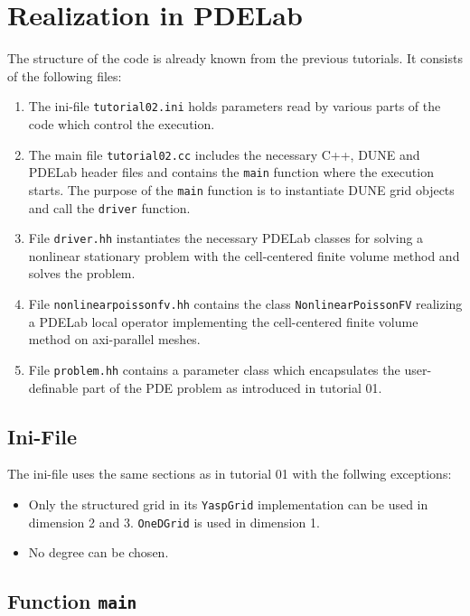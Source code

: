 \documentclass[a4paper,12pt]{article}
\begin{document}
\section{Realization in PDELab}

The structure of the code is already known from the previous tutorials. 
It consists of the following files:
\begin{enumerate}[1)]
\item The ini-file
\lstinline{tutorial02.ini} holds parameters read by various parts of the code
which control the execution. 
\item The main file \lstinline{tutorial02.cc} includes the necessary C++,
DUNE and PDELab header files
and contains the \lstinline{main} function where the execution starts. 
The purpose of the \lstinline{main} function is
to instantiate DUNE grid objects and call the \lstinline{driver} function.
\item File \lstinline{driver.hh} instantiates the necessary PDELab classes 
for solving a nonlinear stationary problem with the cell-centered finite
volume method and solves the problem.
\item File \lstinline{nonlinearpoissonfv.hh} contains the class
\lstinline{NonlinearPoissonFV} realizing a PDELab local operator implementing
the cell-centered finite volume method on axi-parallel meshes.
\item File \lstinline{problem.hh} contains a parameter class which
encapsulates the user-definable part of the PDE problem as introduced in 
tutorial 01.
\end{enumerate}

\subsection{Ini-File}

The ini-file uses the same sections as in tutorial 01 with the follwing exceptions:
\begin{itemize}
\item Only the structured grid in its \lstinline{YaspGrid} implementation can be used
in dimension 2 and 3. \lstinline{OneDGrid} is used in dimension 1.
\item No degree can be chosen. 
\end{itemize}

\subsection{Function \lstinline{main}}
\end{document}
